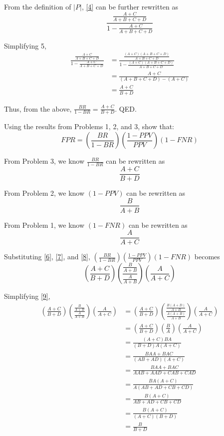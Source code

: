 \documentclass{cisXXX} %
\begin{document}
From the definition of $|P|$, \eqref{4} can be further rewritten as
\begin{equation}
\label{5} \frac{\frac{A+C}{A+B+C+D}}{1-\frac{A+C}{A+B+C+D}}
\end{equation}

Simplifying 5,
\begin{align*}
\frac{\frac{A+C}{A+B+C+D}}{1-\frac{A+C}{A+B+C+D}} &= \frac{\frac{(A+C)(A+B+C+D)}{A+B+C+D}}{1-\frac{(A+C)(A+B+C+D)}{A+B+C+D}}\\
&= \frac{A+C}{(A+B+C+D) - (A+C)}\\
&= \frac{A+C}{B+D}
\end{align*}

Thus, from the above, $\frac{BR}{1-BR} = \frac{A+C}{B+D}$. QED.

\HWproblem
Using the results from Problems 1, 2, and 3, show that:
$$FPR = (\frac{BR}{1-BR})(\frac{1-PPV}{PPV})(1 -FNR)$$

From Problem 3, we know $\frac{BR}{1-BR}$ can be rewritten as
\begin{equation}
\label{6} \frac{A+C}{B+D}
\end{equation}

From Problem 2, we know $(1-PPV)$ can be rewritten as
\begin{equation}
\label{7} \frac{B}{A+B}
\end{equation}

From Problem 1, we know $(1-FNR)$ can be rewritten as
\begin{equation}
\label{8} \frac{A}{A+C}
\end{equation}

Substituting \eqref{6}, \eqref{7}, and \eqref{8}, $(\frac{BR}{1-BR})(\frac{1-PPV}{PPV})(1 -FNR)$ becomes
\begin{equation}
\label{9} (\frac{A+C}{B+D})(\frac{\frac{B}{A+B}}{\frac{A}{A+B}})(\frac{A}{A+C})
\end{equation}

Simplifying \eqref{9},
\begin{align*}
(\frac{A+C}{B+D})(\frac{\frac{B}{A+B}}{\frac{A}{A+B}})(\frac{A}{A+C}) &= (\frac{A+C}{B+D})(\frac{\frac{B(A+D)}{A+B}}{\frac{A(A+B)}{A+B}})(\frac{A}{A+C})\\
&= (\frac{A+C}{B+D})(\frac{B}{A})(\frac{A}{A+C})\\
&= \frac{(A+C)BA}{(B+D)A(A+C)}\\
&= \frac{BAA+BAC}{(AB+AD)(A+C)}\\
&= \frac{BAA+BAC}{AAB+AAD+CAB+CAD}\\
&= \frac{BA(A+C)}{A(AB+AD+CB+CD)}\\
&= \frac{B(A+C)}{AB+AD+CB+CD}\\
&= \frac{B(A+C)}{(A+C)(B+D)}\\
&= \frac{B}{B+D}
\end{align*}
\end{document}
